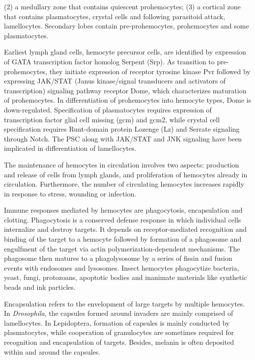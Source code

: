 \documentclass[11pt]{article}
\begin{document}
\begin{sloppypar}
(2) a medullary zone that contains quiescent prohemocytes; 
(3) a cortical zone that contains plasmatocytes, crystal cells and following parasitoid attack, lamellocytes. 
Secondary lobes contain pre-prohemocytes, prohemocytes and some plasmatocytes. 
\par
Earliest lymph gland cells, hemocyte precursor cells, are identified by expression of GATA transcription factor homolog Serpent (Srp). 
As transition to pre-prohemocytes, they initiate expression of receptor tyrosine kinase Pvr followed by expressing JAK/STAT (Janus kinase/signal transducers and activators of transcription) signaling pathway receptor Dome, which characterizes maturation of prohemocytes. 
In differentiation of prohemocytes into hemocyte types, Dome is down-regulated. 
Specification of plasmatocytes requires expression of transcription factor glial cell missing (gcm) and gcm2, while crystal cell specification requires Runt-domain protein Lozenge (Lz) and Serrate signaling through Notch. 
The PSC along with JAK/STAT and JNK signaling have been implicated in differentiation of lamellocytes.
\par
The maintenance of hemocytes in circulation involves two aspects: production and release of cells from lymph glands, and proliferation of hemocytes already in circulation. 
Furthermore, the number of circulating hemocytes increases rapidly in response to stress, wounding or infection. 
\par
Immune responses mediated by hemocytes are phagocytosis, encapsulation and clotting. 
Phagocytosis is a conserved defense response in which individual cells internalize and destroy targets. 
It depends on receptor-mediated recognition and binding of the target to a hemocyte followed by formation of a phagosome and engulfment of the target via actin polymerization-dependent mechanisms. 
The phagosome then matures to a phagolysosome by a series of fissin and fusion events with endosomes and lysosomes. 
Insect hemocytes phagocytize bacteria, yeast, fungi, protozoans, apoptotic bodies and inanimate materials like synthetic beads and ink particles. 
\par
Encapsulation refers to the envelopment of large targets by multiple hemocytes. 
In \textit{Drosophila}, the capsules formed around invaders are mainly comprised of lamellocytes. 
In Lepidoptera, formation of capsules is mainly conducted by plasmatocytes, while cooperation of granulocytes are sometimes required for recognition and encapsulation of targets. 
Besides, melanin is often deposited within and around the capsules.

\end{sloppypar}
\end{document}
